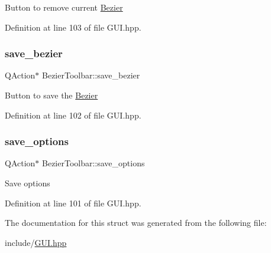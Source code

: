 Button to remove current \mbox{\hyperlink{classBezier}{Bezier}} 

Definition at line 103 of file G\+U\+I.\+hpp.

\mbox{\label{structBezierToolbar_a2848e3a1e3d0eb3dfe63959c12538782}} 
\subsubsection{\texorpdfstring{save\+\_\+bezier}{save\_bezier}}
{\footnotesize\ttfamily Q\+Action$\ast$ Bezier\+Toolbar\+::save\+\_\+bezier}

Button to save the \mbox{\hyperlink{classBezier}{Bezier}} 

Definition at line 102 of file G\+U\+I.\+hpp.

\mbox{\label{structBezierToolbar_a9d3e4ffe8c28b246dafd257110e28994}} 
\subsubsection{\texorpdfstring{save\+\_\+options}{save\_options}}
{\footnotesize\ttfamily Q\+Action$\ast$ Bezier\+Toolbar\+::save\+\_\+options}

Save options 

Definition at line 101 of file G\+U\+I.\+hpp.



The documentation for this struct was generated from the following file\+:\begin{DoxyCompactItemize}
\item 
include/\mbox{\hyperlink{GUI_8hpp}{G\+U\+I.\+hpp}}\end{DoxyCompactItemize}
